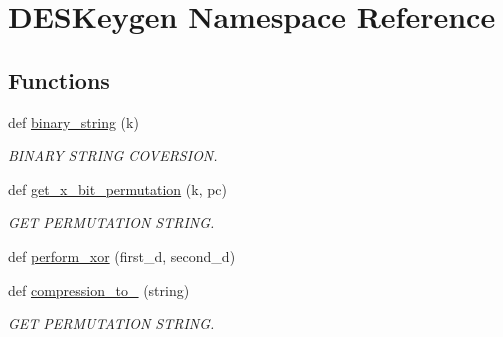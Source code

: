 \hypertarget{namespaceDESKeygen}{}\section{D\+E\+S\+Keygen Namespace Reference}
\label{namespaceDESKeygen}
\subsection*{Functions}
\begin{DoxyCompactItemize}
\item 
def \hyperlink{namespaceDESKeygen_a84313d066275cfa7748f56adc4405def}{binary\+\_\+string} (k)
\begin{DoxyCompactList}\small\item\em B\+I\+N\+A\+RY S\+T\+R\+I\+NG C\+O\+V\+E\+R\+S\+I\+ON. \end{DoxyCompactList}\item 
def \hyperlink{namespaceDESKeygen_a54842a0190e5d94c214033d9d9b8acfe}{get\+\_\+x\+\_\+bit\+\_\+permutation} (k, pc)
\begin{DoxyCompactList}\small\item\em G\+ET P\+E\+R\+M\+U\+T\+A\+T\+I\+ON S\+T\+R\+I\+NG. \end{DoxyCompactList}\item 
def \hyperlink{namespaceDESKeygen_ad8cc7c44b9ccc58a64ae4794d018024a}{perform\+\_\+xor} (first\+\_\+d, second\+\_\+d)
\item 
def \hyperlink{namespaceDESKeygen_a666d1d02c8340e03317dd6480555b8d9}{compression\+\_\+to\+\_} (string)
\begin{DoxyCompactList}\small\item\em G\+ET P\+E\+R\+M\+U\+T\+A\+T\+I\+ON S\+T\+R\+I\+NG. \end{DoxyCompactList}\end{DoxyCompactItemize}
